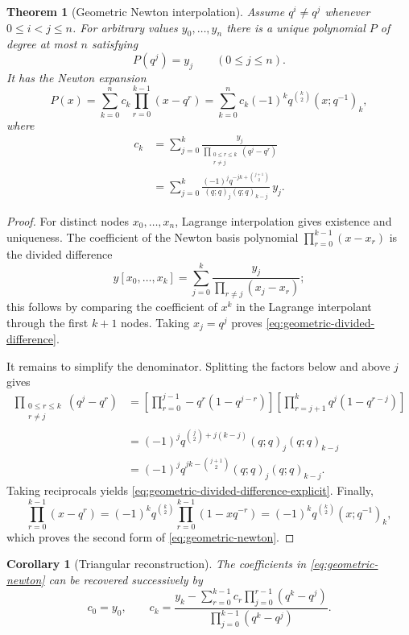 \documentclass[11pt,a4paper,oneside,openany]{book}
\newtheorem{theorem}{Theorem}[chapter]
\newtheorem{corollary}[corollary]{Corollary}
\theoremstyle{definition}
\theoremstyle{remark}
\begin{document}
\begin{theorem}[Geometric Newton interpolation]\label{thm:geometric-newton}
Assume $q^i\ne q^j$ whenever $0\le i<j\le n$.  For arbitrary values $y_0,\ldots,y_n$ there is a unique polynomial $P$ of degree at most $n$ satisfying
\[
 P(q^j)=y_j\qquad(0\le j\le n).
\]
It has the Newton expansion
\[
 P(x)=\sum_{k=0}^{n}c_k\prod_{r=0}^{k-1}(x-q^r)
 =\sum_{k=0}^{n}c_k(-1)^kq^{\binom k2}(x;q^{-1})_k,
 \tag{17.15}\label{eq:geometric-newton}
\]
where
\begin{align}
 c_k
 &=\sum_{j=0}^{k}
 \frac{y_j}{\prod_{\substack{0\le r\le k\\r\ne j}}(q^j-q^r)}
 \tag{17.16}\label{eq:geometric-divided-difference}\\
 &=\sum_{j=0}^{k}
 \frac{(-1)^j q^{-jk+\binom{j+1}{2}}}{(q;q)_j(q;q)_{k-j}}\,y_j.
 \tag{17.17}\label{eq:geometric-divided-difference-explicit}
\end{align}
\end{theorem}

\begin{proof}
For distinct nodes $x_0,\ldots,x_n$, Lagrange interpolation gives existence and uniqueness.  The coefficient of the Newton basis polynomial
\(
 \prod_{r=0}^{k-1}(x-x_r)
\)
is the divided difference
\[
 y[x_0,\ldots,x_k]
 =\sum_{j=0}^{k}\frac{y_j}{\prod_{r\ne j}(x_j-x_r)};
\]
this follows by comparing the coefficient of $x^k$ in the Lagrange interpolant through the first $k+1$ nodes.  Taking $x_j=q^j$ proves \eqref{eq:geometric-divided-difference}.

It remains to simplify the denominator.  Splitting the factors below and above $j$ gives
\begin{align*}
 \prod_{\substack{0\le r\le k\\r\ne j}}(q^j-q^r)
 &=\left[\prod_{r=0}^{j-1}-q^r(1-q^{j-r})\right]
   \left[\prod_{r=j+1}^{k}q^j(1-q^{r-j})\right]\\
 &=(-1)^jq^{\binom j2+j(k-j)}(q;q)_j(q;q)_{k-j}\\
 &=(-1)^jq^{jk-\binom{j+1}{2}}(q;q)_j(q;q)_{k-j}.
\end{align*}
Taking reciprocals yields \eqref{eq:geometric-divided-difference-explicit}.  Finally,
\[
 \prod_{r=0}^{k-1}(x-q^r)
 =(-1)^kq^{\binom k2}\prod_{r=0}^{k-1}(1-xq^{-r})
 =(-1)^kq^{\binom k2}(x;q^{-1})_k,
\]
which proves the second form of \eqref{eq:geometric-newton}.
\end{proof}

\begin{corollary}[Triangular reconstruction]\label{cor:geometric-triangular}
The coefficients in \eqref{eq:geometric-newton} can be recovered successively by
\[
 c_0=y_0,
 \qquad
 c_k=\frac{y_k-\sum_{r=0}^{k-1}c_r\prod_{j=0}^{r-1}(q^k-q^j)}
 {\prod_{j=0}^{k-1}(q^k-q^j)}.
 \tag{17.18}\label{eq:triangular-newton}
\]
\end{corollary}
\end{document}
